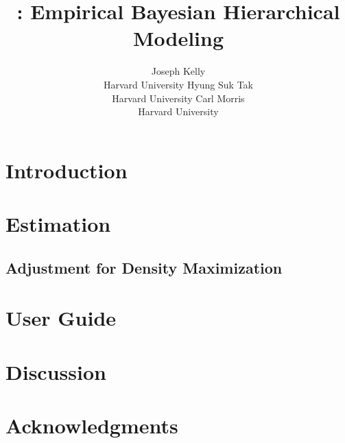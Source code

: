 \documentclass[article]{jss}
\author{Joseph Kelly\\Harvard University \And 
        Hyung Suk Tak\\Harvard University \And
        Carl Morris\\ Harvard University}
\title{\pkg{Rgbp}: Empirical Bayesian Hierarchical Modeling}
\begin{document}

\section[introduction]{Introduction}

\section[estimation]{Estimation}
\subsection[adm]{Adjustment for Density Maximization}

\section[userguide]{User Guide}

\section[discussion]{Discussion}

\section[acknowledgments]{Acknowledgments}
\end{document}
